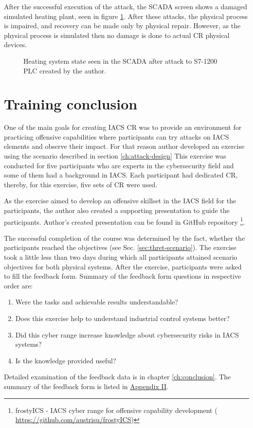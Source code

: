 After the successful execution of the attack, the SCADA screen shows a damaged simulated heating plant, seen in figure \ref{fig:scada-final}. After these attacks, the physical process is impaired, and recovery can be made only by physical repair. However, as the physical process is simulated then no damage is done to actual CR physical devices.

\begin{figure}
	\caption{Heating system state seen in the SCADA after attack to S7-1200 PLC created by the author.}
	\label{fig:scada-final}
\end{figure}


\section{Training conclusion} \label{sec:excerisse-conclusion}

One of the main goals for creating IACS CR was to provide an environment for practicing offensive capabilities where participants can try attacks on IACS elements and observe their impact. For that reason author developed an exercise using the scenario described in section \ref{ch:attack-design} This exercise was conducted for five participants who are experts in the cybersecurity field and some of them had a background in IACS. Each participant had dedicated CR, thereby, for this exercise, five sets of CR were used.

As the exercise aimed to develop an offensive skillset in the IACS field for the participants, the author also created a supporting presentation to guide the participants. Author's created presentation can be found in GitHub repository \footnote{frostyICS - IACS cyber range for offensive capability development ( \url{https://github.com/austrisu/frostyICS})}.

The successful completion of the course was determined by the fact, whether the participants reached the objectives (see Sec. \ref{sec:thret-scenario}). The exercise took a little less than two days during which all participants attained scenario objectives for both physical systems. After the exercise, participants were asked to fill the feedback form. Summary of the feedback form questions in respective order are:

\begin{enumerate}
	\item Were the tasks and achievable results understandable?
	\item Does this exercise help to understand industrial control systems better? 
	\item Did this cyber range increase knowledge about cybersecurity risks in IACS systems?
	\item Is the knowledge provided useful? 
\end{enumerate}

Detailed examination of the feedback data is in chapter \ref{ch:conclusion}. The summary of the feedback form is listed in \hyperlink{page.91}{Appendix II}.

